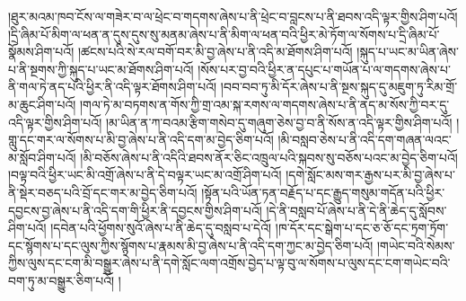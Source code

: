 །ཐུར་མའམ་ཁབ་ངོས་ལ་གཟེར་བ་ལ་ཕྲེང་བ་གདགས་ཞེས་པ་ནི་ཕྲེང་བ་བླངས་པ་ནི་ཐབས་འདི་ལྟར་གྱིས་ཤིག་པའོ། །དྲི་ཞིམ་པོ་མིག་ལ་ཕན་ན་དུས་དུས་སུ་མནམ་ཞེས་པ་ནི་མིག་ལ་ཕན་བའི་ཕྱིར་མེ་ཏོག་ལ་སོགས་པ་དྲི་ཞིམ་པོ་སྣོམས་ཤིག་པའོ། །ཚངས་པའི་སེ་རལ་བགོ་བར་མི་བྱ་ཞེས་པ་ནི་འདི་མ་ཐོགས་ཤིག་པའོ། །སྐུད་པ་ཡང་མ་ཡིན་ཞེས་པ་ནི་སྔགས་ཀྱི་སྐུད་པ་ཡང་མ་ཐོགས་ཤིག་པའོ། །སོས་པར་བྱ་བའི་ཕྱིར་ན་དཔུང་པ་གཡོན་པ་ལ་གདགས་ཞེས་པ་ནི་གལ་ཏེ་ནད་པའི་ཕྱིར་ནི་འདི་ལྟར་ཐོགས་ཤིག་པའོ། །བབ་བབ་ཏུ་མི་དོར་ཞེས་པ་ནི་སྔས་སྐུད་དུ་མཇུག་ཏུ་རིམ་གྲོ་མ་ཆུང་ཤིག་པའོ། །གལ་ཏེ་མ་བཏགས་ན་གོས་ཀྱི་གྲ་འམ་སྐ་རགས་ལ་གདགས་ཞེས་པ་ནི་ནད་མ་སོས་ཀྱི་བར་དུ་འདི་ལྟར་གྱིས་ཤིག་པའོ། །མ་ཡིན་ན་ཀ་བའམ་རྩིག་གསེབ་དུ་གཞུག་ཅེས་བྱ་བ་ནི་སོས་ན་འདི་ལྟར་གྱིས་ཤིག་པའོ། །གླུ་དང་གར་ལ་སོགས་པ་མི་བྱ་ཞེས་པ་ནི་འདི་དག་མ་བྱེད་ཅིག་པའོ། །མི་བསླབ་ཅེས་པ་ནི་འདི་དག་གཞན་ལའང་མ་སློབ་ཤིག་པའོ། །མི་བཅོས་ཞེས་པ་ནི་འདིའི་ཐབས་ནོར་ཅིང་འཁྲུལ་པའི་སྐབས་སུ་བཅོས་པའང་མ་བྱེད་ཅིག་པའོ། །བལྟ་བའི་ཕྱིར་ཡང་མི་འགྲོ་ཞེས་པ་ནི་དེ་བལྟར་ཡང་མ་འགྲོ་ཤིག་པའོ། །དགེ་སློང་མས་གར་རྒྱས་པར་མི་བྱ་ཞེས་པ་ནི་སྡེར་བཅད་པའི་བྲོ་དང་གར་མ་བྱེད་ཅིག་པའོ། །སྟོན་པའི་ཡོན་ཏན་བརྗོད་པ་དང་རྒྱུད་གསུམ་གདོན་པའི་ཕྱིར་དབྱངས་བྱ་ཞེས་པ་ནི་འདི་དག་གི་ཕྱིར་ནི་དབྱངས་གྱིས་ཤིག་པའོ། །དེ་ནི་བསླབ་པོ་ཞེས་པ་ནི་དེ་ནི་ཆེད་དུ་སློབས་ཤིག་པའོ། །དབེན་པའི་ཕྱོགས་སུའོ་ཞེས་པ་ནི་ཆེད་དུ་བསླབ་པ་དེའོ། །ཁ་དོར་དང་སྒེག་པ་དང་ཅ་ཅོ་དང་ཏྲག་ཏྲོག་དང་སྙོགས་པ་དང་ལུས་ཀྱིས་སྙོགས་པ་རྣམས་མི་བྱ་ཞེས་པ་ནི་འདི་དག་ཀྱང་མ་བྱེད་ཅིག་པའོ། །གཡེང་བའི་སེམས་ཀྱིས་ལུས་དང་ངག་མི་བསྒྱུར་ཞེས་པ་ནི་དགེ་སློང་ལག་འགྲོས་བྱེད་པ་ལྟ་བུ་ལ་སོགས་པ་ལུས་དང་ངག་གཡེང་བའི་བག་ཏུ་མ་བསྒྱུར་ཅིག་པའོ། །
